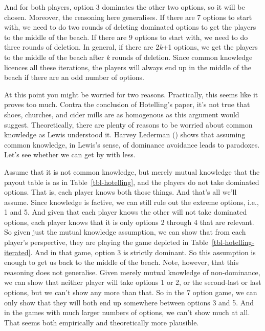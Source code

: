 \documentclass[
  12pt,
  letterpaper,
]{scrbook}
\begin{document}
And for both players, option 3 dominates the other two options, so it
will be chosen. Moreover, the reasoning here generalises. If there are 7
options to start with, we need to do two rounds of deleting dominated
options to get the players to the middle of the beach. If there are 9
options to start with, we need to do three rounds of deletion. In
general, if there are 2\emph{k}+1 options, we get the players to the
middle of the beach after \emph{k} rounds of deletion. Since common
knowledge licences all these iterations, the players will always end up
in the middle of the beach if there are an odd number of options.

At this point you might be worried for two reasons. Practically, this
seems like it proves too much. Contra the conclusion of Hotelling's
paper, it's not true that shoes, churches, and cider mills are as
homogenous as this argument would suggest. Theoretically, there are
plenty of reasons to be worried about common knowledge as Lewis
understood it. Harvey Lederman () shows
that assuming common knowledge, in Lewis's sense, of dominance avoidance
leads to paradoxes. Let's see whether we can get by with less.

Assume that it is not common knowledge, but merely mutual knowledge that
the payout table is as in Table~\ref{tbl-hotelling}, and the players do
not take dominated options. That is, each player knows both those
things. And that's all we'll assume. Since knowledge is factive, we can
still rule out the extreme options, i.e., 1 and 5. And given that each
player knows the other will not take dominated options, each player
knows that it is only options 2 through 4 that are relevant. So given
just the mutual knowledge assumption, we can show that from each
player's perspective, they are playing the game depicted in
Table~\ref{tbl-hotelling-iterated}. And in that game, option 3 is
strictly dominant. So this assumption is enough to get us back to the
middle of the beach. Note, however, that this reasoning does not
generalise. Given merely mutual knowledge of non-dominance, we can show
that neither player will take options 1 or 2, or the second-last or last
options, but we can't show any more than that. So in the 7 option game,
we can only show that they will both end up somewhere between options 3
and 5. And in the games with much larger numbers of options, we can't
show much at all. That seems both empirically and theoretically more
plausible.
\end{document}
